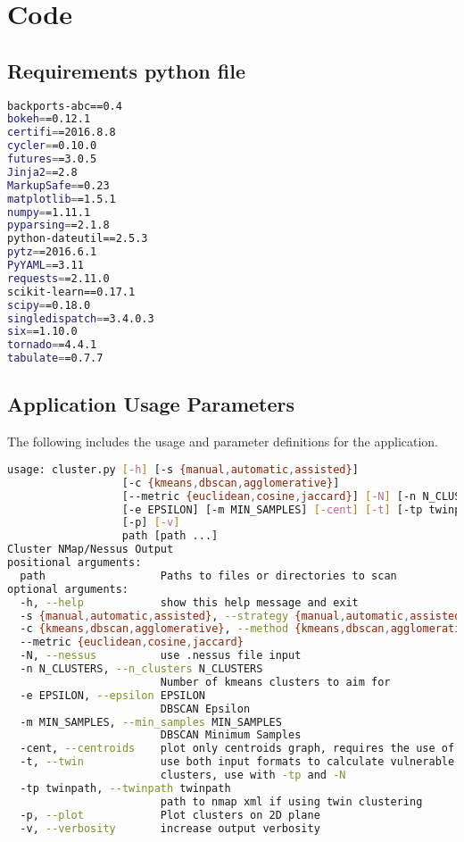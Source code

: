 \chapter{Code}
\section{Requirements python file}
\label{requirementsfile}
\begin{lstlisting}[language=bash]
backports-abc==0.4
bokeh==0.12.1
certifi==2016.8.8
cycler==0.10.0
futures==3.0.5
Jinja2==2.8
MarkupSafe==0.23
matplotlib==1.5.1
numpy==1.11.1
pyparsing==2.1.8
python-dateutil==2.5.3
pytz==2016.6.1
PyYAML==3.11
requests==2.11.0
scikit-learn==0.17.1
scipy==0.18.0
singledispatch==3.4.0.3
six==1.10.0
tornado==4.4.1
tabulate==0.7.7
\end{lstlisting}

\section{Application Usage Parameters}
\label{usage}
The following includes the usage and parameter definitions for the application.
\begin{lstlisting}[language=bash]
usage: cluster.py [-h] [-s {manual,automatic,assisted}]
                  [-c {kmeans,dbscan,agglomerative}]
                  [--metric {euclidean,cosine,jaccard}] [-N] [-n N_CLUSTERS]
                  [-e EPSILON] [-m MIN_SAMPLES] [-cent] [-t] [-tp twinpath]
                  [-p] [-v]
                  path [path ...]
Cluster NMap/Nessus Output
positional arguments:
  path                  Paths to files or directories to scan
optional arguments:
  -h, --help            show this help message and exit
  -s {manual,automatic,assisted}, --strategy {manual,automatic,assisted}
  -c {kmeans,dbscan,agglomerative}, --method {kmeans,dbscan,agglomerative}
  --metric {euclidean,cosine,jaccard}
  -N, --nessus          use .nessus file input
  -n N_CLUSTERS, --n_clusters N_CLUSTERS
                        Number of kmeans clusters to aim for
  -e EPSILON, --epsilon EPSILON
                        DBSCAN Epsilon
  -m MIN_SAMPLES, --min_samples MIN_SAMPLES
                        DBSCAN Minimum Samples
  -cent, --centroids    plot only centroids graph, requires the use of "-p"
  -t, --twin            use both input formats to calculate vulnerable single
                        clusters, use with -tp and -N
  -tp twinpath, --twinpath twinpath
                        path to nmap xml if using twin clustering
  -p, --plot            Plot clusters on 2D plane
  -v, --verbosity       increase output verbosity
\end{lstlisting}

